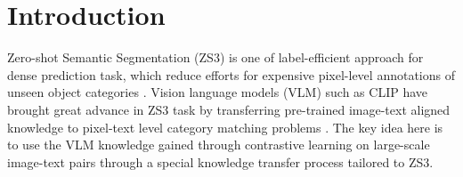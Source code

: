 \documentclass[nohyperref]{article}
\theoremstyle{plain}
\theoremstyle{definition}
\theoremstyle{remark}
\begin{document}
\begin{abstract}
\end{abstract}






\section{Introduction}
\label{submission}



Zero-shot Semantic Segmentation (ZS3) is one of label-efficient %
approach for dense prediction task, which reduce efforts for expensive pixel-level annotations of unseen object categories \cite{bucher2019zero}.
Vision language models (VLM) such as CLIP \cite{radford2021clip} have brought great advance in  ZS3 task by transferring pre-trained image-text aligned knowledge to 
{pixel-text level} category matching problems \cite{ding2022zegformer, xu2021zsseg, zhou2022maskclip, rao2022denseclip, zhou2022zegclip}.  
The key idea here is to use the VLM knowledge gained through contrastive learning on large-scale image-text pairs through a special knowledge transfer process tailored to ZS3.
\end{document}
